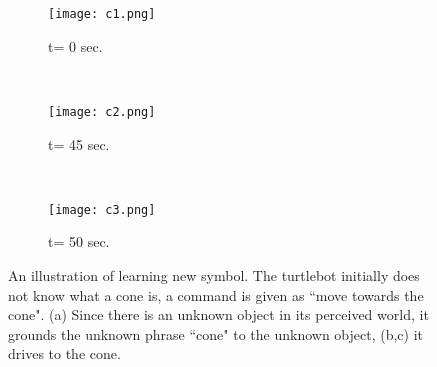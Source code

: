 

\begin{figure}
\begin{subfigure}[b]{0.305\columnwidth}
\centering
\texttt{[image: c1.png]}
\caption{t= 0 sec.}
\label{fig:exp_new_1}
\end{subfigure}
~
\begin{subfigure}[b]{0.31\columnwidth}
\centering
\texttt{[image: c2.png]}
\caption{t= 45 sec.}
\label{fig:exp_new_2}
\end{subfigure}
~
\begin{subfigure}[b]{0.315\columnwidth}
\centering
\texttt{[image: c3.png]}
\caption{t= 50 sec.}
\label{fig:exp_new_3}
\end{subfigure}
\caption{An illustration of learning new symbol. The turtlebot initially does not know what a cone is, a command is given as ``move towards the cone". (a) Since there is an unknown object in its perceived world, it grounds the unknown phrase ``cone" to the unknown object, (b,c) it drives to the cone.}
\label{fig:cone}
\end{figure}

